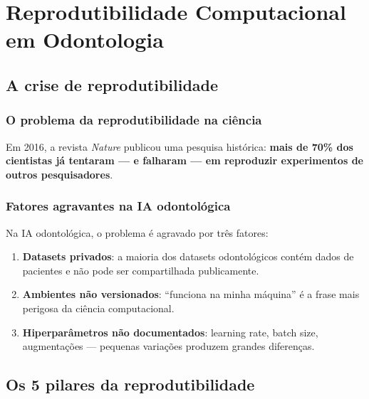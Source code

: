 \section{Reprodutibilidade Computacional em Odontologia}

\subsection{A crise de reprodutibilidade}

\subsubsection{O problema da reprodutibilidade na ciência}

Em 2016, a revista \textit{Nature} publicou uma pesquisa histórica:
\textbf{mais de 70\% dos cientistas já tentaram — e falharam — em
reproduzir experimentos de outros pesquisadores}.


 

\subsubsection{Fatores agravantes na IA odontológica}

Na IA odontológica, o problema é agravado por três fatores:

\begin{enumerate}
  \item \textbf{Datasets privados}: a maioria dos datasets odontológicos
    contém dados de pacientes e não pode ser compartilhada publicamente.
  \item \textbf{Ambientes não versionados}: ``funciona na minha máquina''
    é a frase mais perigosa da ciência computacional.
  \item \textbf{Hiperparâmetros não documentados}: learning rate, batch
    size, augmentações — pequenas variações produzem grandes diferenças.
\end{enumerate}

\subsection{Os 5 pilares da reprodutibilidade}

